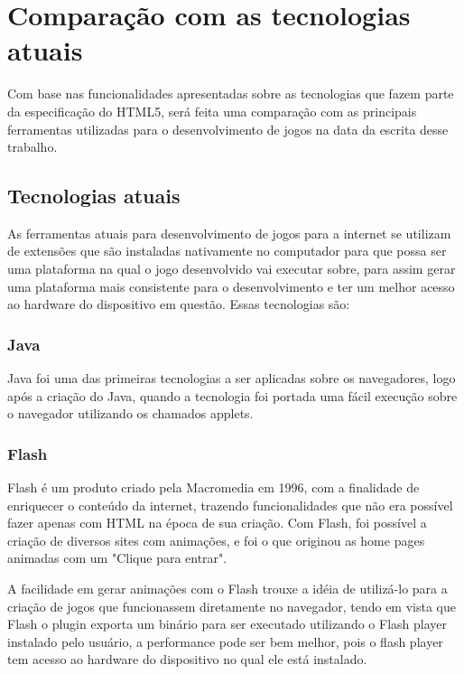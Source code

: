 \section{Comparação com as tecnologias atuais}

Com base nas funcionalidades apresentadas sobre as tecnologias que
fazem parte da especificação do HTML5, será feita uma comparação com
as principais ferramentas utilizadas para o desenvolvimento de jogos
na data da escrita desse trabalho.

\subsection{Tecnologias atuais}

As ferramentas atuais para desenvolvimento de jogos para a internet se
utilizam de extensões que são instaladas nativamente no computador
para que possa ser uma plataforma na qual o jogo desenvolvido vai
executar sobre, para assim gerar uma plataforma mais consistente para
o desenvolvimento e ter um melhor acesso ao hardware do dispositivo em
questão. Essas tecnologias são:

\subsubsection{Java}

Java foi uma das primeiras tecnologias a ser aplicadas sobre os
navegadores, logo após a criação do Java, quando a tecnologia foi
portada uma fácil execução sobre o navegador utilizando os chamados
applets.

\subsubsection{Flash}

Flash é um produto criado pela Macromedia em 1996, com a finalidade de
enriquecer o conteúdo da internet, trazendo funcionalidades que não
era possível fazer apenas com HTML na época de sua criação.
Com Flash, foi possível a criação de diversos sites com animações, e
foi o que originou as home pages animadas com um "Clique para entrar".

A facilidade em gerar animações com o Flash trouxe a idéia de
utilizá-lo para a criação de jogos que funcionassem diretamente no
navegador, tendo em vista que Flash o plugin exporta um binário para ser
executado utilizando o Flash player instalado pelo usuário, a
performance pode ser bem melhor, pois o flash player tem acesso ao
hardware do dispositivo no qual ele está instalado.

